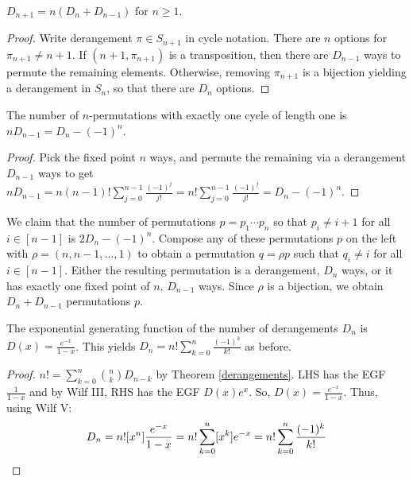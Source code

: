 \documentclass[a4paper]{article}
\begin{document}
\begin{lemma}
$D_{n+1}=n(D_n+D_{n-1})$ for $n\geq1$.

\begin{hl}
\begin{proof}
Write derangement $\pi\in S_{n+1}$ in cycle notation. There are $n$ options for $\pi_{n+1}\neq n+1$. If $(n+1,\pi_{n+1})$ is a transposition, then there are $D_{n-1}$ ways to permute the remaining elements. Otherwise, removing $\pi_{n+1}$ is a bijection yielding a derangement in $S_n$, so that there are $D_n$ options.
\end{proof}
\end{hl}
\end{lemma}

\begin{lemma}\label{one_fixed_point}
The number of $n$-permutations with exactly one cycle of length one is $nD_{n-1}=D_n-(-1)^n$.

\begin{hl}
\begin{proof}
Pick the fixed point $n$ ways, and permute the remaining via a derangement $D_{n-1}$ ways to get $nD_{n-1}=n(n-1)!\sum_{j=0}^{n-1}\frac{(-1)^j}{j!}=n!\sum_{j=0}^{n-1}\frac{(-1)^j}{j!}=D_n-(-1)^n$.
\end{proof}
\end{hl}
\end{lemma}

\begin{example}
We claim that the number of permutations $p=p_1\cdots p_n$ so that $p_i\neq i+1$ for all $i\in[n-1]$ is $2D_n-(-1)^n$. Compose any of these permutations $p$ on the left with $\rho=(n,n-1,\dots,1)$ to obtain a permutation $q=\rho p$ such that $q_i\neq i$ for all $i\in[n-1]$. Either the resulting permutation is a derangement, $D_n$ ways, or it has exactly one fixed point of $n$, $D_{n-1}$ ways. Since $\rho$ is a bijection, we obtain $D_n+D_{n-1}$ permutations $p$.
\end{example}

\begin{proposition}
The exponential generating function of the number of derangements $D_n$ is $D(x)=\frac{e^{-x}}{1-x}$. This yields $D_n=n!\sum_{k=0}^n\frac{(-1)^k}{k!}$ as before.

\begin{hl}
\begin{proof}
$n!=\sum_{k=0}^n\binom nkD_{n-k}$ by Theorem \ref{derangements}. LHS has the EGF $\frac1{1-x}$ and by Wilf III, RHS has the EGF $D(x)e^x$. So, $D(x)=\frac{e^{-x}}{1-x}$. Thus, using Wilf V:
\begin{equation*}
D_n=n![x^n]\frac{e^{-x}}{1-x}
=n!\sum_{k=0}^n[x^k]e^{-x}
=n!\sum_{k=0}^n\frac{(-1)^k}{k!}\qedhere
\end{equation*}
\end{proof}
\end{hl}
\end{proposition}
\end{document}
